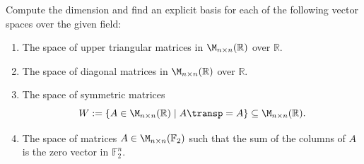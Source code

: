 \begin{exercise}
\label{exc:matrix_subspaces_dimension_bases}
Compute the dimension and find an explicit basis for each of the following vector spaces over the given field:
\begin{enumerate}
    \item The space of upper triangular matrices in $\M_{n \times n}(\mathbb{R})$ over $\mathbb{R}$.
    \item The space of diagonal matrices in $\M_{n \times n}(\mathbb{R})$ over $\mathbb{R}$.
    \item The space of symmetric matrices
    \[
    W := \{A \in \M_{n \times n}(\mathbb{R}) \mid A\transp = A\} \subseteq \M_{n \times n}(\mathbb{R}).
    \]
    \item The space of matrices $A \in \M_{n \times n}(\mathbb{F}_2)$ such that the sum of the columns of $A$ is the zero vector in $\mathbb{F}_2^n$.
\end{enumerate}
\end{exercise}

